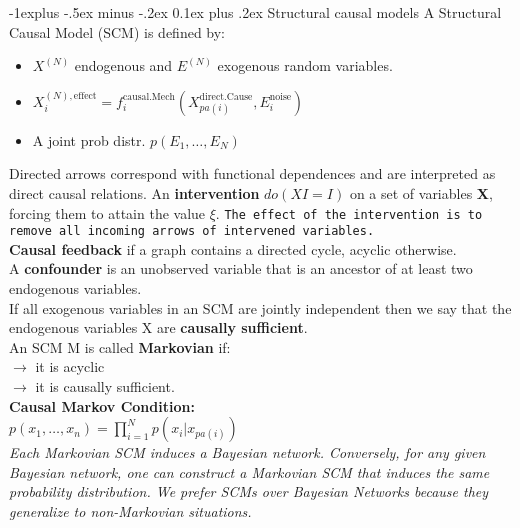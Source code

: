 \documentclass[9pt,landscape]{article}
\makeatletter
\renewcommand{\subsection}{\@startsection{subsection}{2}{0mm}%
                                {-1explus -.5ex minus -.2ex}%
                                {0.1ex plus .2ex}%
                                {\normalfont\scriptsize\bfseries}}
\makeatother
\begin{document}
\begin{multicols}{3}
\subsection{Structural causal models}
A Structural Causal Model (SCM) is defined by:
\begin{itemize}
\item $X^{(N)}$ endogenous and $E^{(N)}$ exogenous random variables.
\item $X_i^{(N), \text{effect}} = f^\text{causal.Mech}_i(X^\text{direct.Cause}_{pa(i)}, E_i^\text{noise})$
\item A joint prob distr. $p(E_1,\ldots, E_N)$
\end{itemize}
Directed arrows correspond with
functional dependences and are interpreted as direct causal relations. An \textbf{intervention} $do(XI = I)$ on a set of variables \textbf{X}, forcing them to attain the value $\xi$. \texttt{The effect of the intervention is to remove all incoming arrows of intervened variables.}\\
\textbf{Causal feedback} if a graph contains a directed cycle, acyclic otherwise.\\
A \textbf{confounder} is an unobserved variable that is an ancestor of at least two
endogenous variables.\\
If all exogenous variables in an SCM are jointly independent then we say that the endogenous variables X are \textbf{causally sufficient}.\\
An SCM M is called \textbf{Markovian} if:\\
$\rightarrow$ it is acyclic\\
$\rightarrow$ it is causally sufficient.\\
\textbf{Causal Markov Condition:}\\
$p(x_1, \ldots, x_n) = \prod_{i=1}^N p(x_i|x_{pa(i)})$\\
\textit{Each Markovian SCM induces a Bayesian network. Conversely, for any given Bayesian network, one can construct a
Markovian SCM that induces the same probability distribution.
We prefer SCMs over Bayesian Networks because they generalize to
non-Markovian situations.}

\end{multicols}
\end{document}
